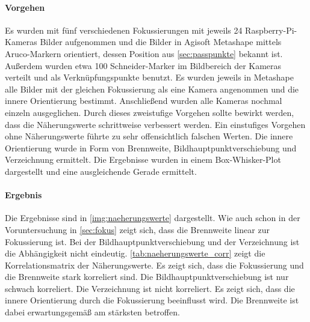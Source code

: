 \documentclass[./00PhotoBox.tex]{subfiles}
\begin{document}
\paragraph{Vorgehen}
Es wurden mit fünf verschiedenen Fokussierungen mit jeweils 24 Raspberry-Pi-Kameras Bilder aufgenommen und die Bilder in Agisoft Metashape mittels Aruco-Markern orientiert, dessen Position aus \autoref{sec:passpunkte} bekannt ist. Außerdem wurden etwa 100 Schneider-Marker im Bildbereich der Kameras verteilt und als Verknüpfungspunkte benutzt. Es wurden jeweils in Metashape alle Bilder mit der gleichen Fokussierung als eine Kamera angenommen und die innere Orientierung bestimmt. Anschließend wurden alle Kameras nochmal einzeln ausgeglichen. Durch dieses zweistufige Vorgehen sollte bewirkt werden, dass die Näherungswerte schrittweise verbessert werden. Ein einstufiges Vorgehen ohne Näherungswerte führte zu sehr offensichtlich falschen Werten. Die innere Orientierung wurde in Form von Brennweite, Bildhauptpunktverschiebung und Verzeichnung ermittelt. Die Ergebnisse wurden in einem Box-Whisker-Plot dargestellt und eine ausgleichende Gerade ermittelt.

\paragraph{Ergebnis}

Die Ergebnisse sind in \autoref{img:naeherungswerte} dargestellt. Wie auch schon in der Voruntersuchung in \autoref{sec:fokus} zeigt sich, dass die Brennweite linear zur Fokussierung ist. Bei der Bildhauptpunktverschiebung und der Verzeichnung ist die Abhängigkeit nicht eindeutig. \autoref{tab:naeherungswerte_corr} zeigt die Korrelationsmatrix der Näherungswerte. Es zeigt sich, dass die Fokussierung und die Brennweite stark korreliert sind. Die Bildhauptpunktverschiebung ist nur schwach korreliert. Die Verzeichnung ist nicht korreliert. Es zeigt sich, dass die innere Orientierung durch die Fokussierung beeinflusst wird. Die Brennweite ist dabei erwartungsgemäß am stärksten betroffen.
\end{document}
